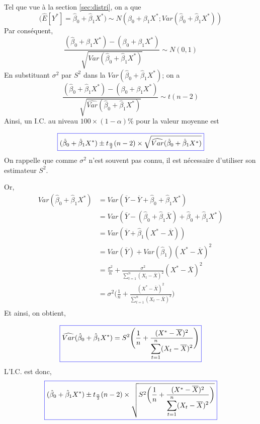 \documentclass[11pt,french]{report}
\begin{document}
Tel que vue à la section \ref{sec:distri}, on a que
$$
\big(\widehat{E}[Y^*] = \hat{\beta}_0 + \hat{\beta}_1X^* \big) \sim N(\beta_0 + \beta_1X^*; Var( \hat{\beta}_0 + \hat{\beta}_1X^*))
$$
Par conséquent,
$$
\frac{(\hat{\beta}_0 + \hat{\beta}_1X^*) - (\beta_0 + \beta_1X^*)}{\sqrt{Var( \hat{\beta}_0 + \hat{\beta}_1X^*)}} \sim N(0,1)
$$
En substituant $\sigma^2$ par $S^2$ dans la $Var(\hat{\beta}_0 + \hat{\beta}_1X^*)$; on a
$$
\frac{(\hat{\beta}_0 + \hat{\beta}_1X^*) - (\beta_0 + \beta_1X^*)}{\sqrt{\widehat{Var}( \hat{\beta}_0 + \hat{\beta}_1X^*)}} \sim t(n-2)
$$
Ainsi, un I.C. au niveau $100 \times(1 -\alpha)\%$ pour la valeur moyenne est

\begin{equation}
\label{eq:IC}
\color{blue}
\boxed{\color{black}
(\hat{\beta}_0 + \hat{\beta}_1X^*)  \pm t_{\frac{\alpha}{2}}(n-2)\times \sqrt{\widehat{Var}( \hat{\beta}_0 + \hat{\beta}_1X^*)}
}
\end{equation}
On rappelle que comme $\sigma^2$ n'est souvent pas connu, il est nécessaire d'utiliser son estimateur $S^2$.

Or, 
\begin{align*}
Var(\hat{\beta}_0 + \hat{\beta}_1X^*)  &= Var(\overline{Y} - \overline{Y} + \hat{\beta}_0 + \hat{\beta}_1X^*) \\
&= Var(\overline{Y} - (\hat{\beta}_0 + \hat{\beta}_1\overline{X}) + \hat{\beta}_0 + \hat{\beta}_1X^*) \\
&= Var(\overline{Y} + \hat{\beta}_1( X^* - \overline{X})) \\
&= Var(\overline{Y}) + Var(\hat{\beta}_1)( X^* - \overline{X})^2 \\
&= \frac{\sigma^2}{n} + \frac{\sigma^2}{\displaystyle\sum_{t=1}^n (X_t - \overline{X})^2}(X^* - \overline{X})^2 \\
&=\sigma^2 \Bigg(\frac{1}{n} + \frac{(X^* - \overline{X})^2 }{\displaystyle\sum_{t=1}^n (X_t - \overline{X})^2}\Bigg)  \\
\end{align*}
Et ainsi, on obtient,

\begin{equation}
\label{eq:var*}
\color{blue}
\boxed{\color{black}
\widehat{Var}(\hat{\beta}_0 + \hat{\beta}_1X^*) = S^2 \Bigg(\frac{1}{n} + \frac{(X^* - \overline{X})^2 }{\displaystyle\sum_{t=1}^n (X_t - \overline{X})^2}\Bigg)  
}
\end{equation}
L'I.C. est donc,
\begin{equation}
\label{eq:IC2}
\color{blue}
\boxed{\color{black}
(\hat{\beta}_0 + \hat{\beta}_1X^*) \pm t_{\frac{\alpha}{2}}(n-2)\times \sqrt{S^2 \bigg(\frac{1}{n} + \frac{(X^* - \overline{X})^2 }{\displaystyle\sum_{t=1}^n (X_t - \overline{X})^2}\bigg)}  
}
\end{equation}
\end{document}
